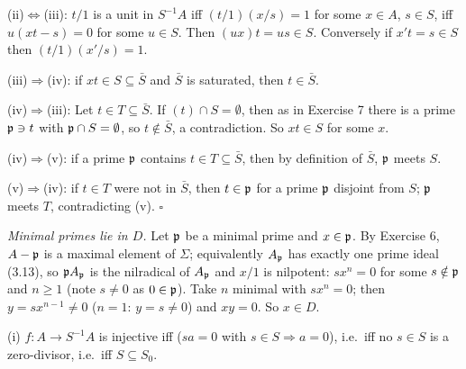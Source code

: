 \documentclass[11pt]{article}
\begin{document}
(ii)$\Leftrightarrow$(iii): $t/1$ is a unit in $S^{-1}A$ iff $(t/1)(x/s)=1$ for some $x\in A$, $s\in S$, iff $u(xt-s)=0$ for some $u\in S$. Then $(ux)t=us\in S$. Conversely if $x't=s\in S$ then $(t/1)(x'/s)=1$.

(iii)$\Rightarrow$(iv): if $xt\in S\subseteq\bar S$ and $\bar S$ is saturated, then $t\in\bar S$.

(iv)$\Rightarrow$(iii): Let $t\in T\subseteq\bar S$. If $(t)\cap S=\emptyset$, then as in Exercise 7 there is a prime $\mathfrak p\ni t$ with $\mathfrak p\cap S=\emptyset$, so $t\notin\bar S$, a contradiction. So $xt\in S$ for some $x$.

(iv)$\Rightarrow$(v): if a prime $\mathfrak p$ contains $t\in T\subseteq\bar S$, then by definition of $\bar S$, $\mathfrak p$ meets $S$.

(v)$\Rightarrow$(iv): if $t\in T$ were not in $\bar S$, then $t\in\mathfrak p$ for a prime $\mathfrak p$ disjoint from $S$; $\mathfrak p$ meets $T$, contradicting (v). \hfill$\square$

\pf
\emph{Minimal primes lie in $D$.} Let $\mathfrak p$ be a minimal prime and $x\in\mathfrak p$. By Exercise 6, $A-\mathfrak p$ is a maximal element of $\Sigma$; equivalently $A_\mathfrak p$ has exactly one prime ideal (3.13), so $\mathfrak p A_\mathfrak p$ is the nilradical of $A_\mathfrak p$ and $x/1$ is nilpotent: $s x^n=0$ for some $s\notin\mathfrak p$ and $n\ge1$ (note $s\ne0$ as $0\in\mathfrak p$). Take $n$ minimal with $sx^n=0$; then $y=sx^{n-1}\ne0$ ($n=1$: $y=s\ne0$) and $xy=0$. So $x\in D$.

(i) $f:A\to S^{-1}A$ is injective iff ($sa=0$ with $s\in S\Rightarrow a=0$), i.e.\ iff no $s\in S$ is a zero-divisor, i.e.\ iff $S\subseteq S_0$.
\end{document}
